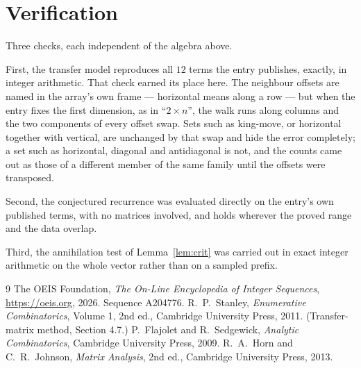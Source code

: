 \documentclass[11pt,a4paper]{article}
\theoremstyle{plain}
\theoremstyle{definition}
\begin{document}
\section{Verification}

Three checks, each independent of the algebra above.

First, the transfer model reproduces all $12$ terms the entry publishes, exactly, in
integer arithmetic. That check earned its place here. The neighbour offsets are named in the
array's own frame --- horizontal means along a row --- but when the entry fixes the first
dimension, as in ``$2\times n$'', the walk runs along columns and the two components of every
offset swap. Sets such as king-move, or horizontal together with vertical, are unchanged by
that swap and hide the error completely; a set such as horizontal, diagonal and antidiagonal
is not, and the counts came out as those of a different member of the same family until the
offsets were transposed.

Second, the conjectured recurrence was evaluated directly on the entry's own published terms,
with no matrices involved, and holds wherever the proved range and the data overlap.

Third, the annihilation test of Lemma~\ref{lem:crit} was carried out in exact integer
arithmetic on the whole vector rather than on a sampled prefix.

\begin{thebibliography}{9}
 The OEIS Foundation, \emph{The On-Line Encyclopedia of Integer
Sequences}, \url{https://oeis.org}, 2026. Sequence A204776.
 R.~P.~Stanley, \emph{Enumerative Combinatorics}, Volume 1, 2nd ed.,
Cambridge University Press, 2011. (Transfer-matrix method, Section 4.7.)
 P.~Flajolet and R.~Sedgewick, \emph{Analytic Combinatorics}, Cambridge
University Press, 2009.
 R.~A.~Horn and C.~R.~Johnson, \emph{Matrix Analysis}, 2nd ed., Cambridge
University Press, 2013.
\end{thebibliography}
\end{document}
